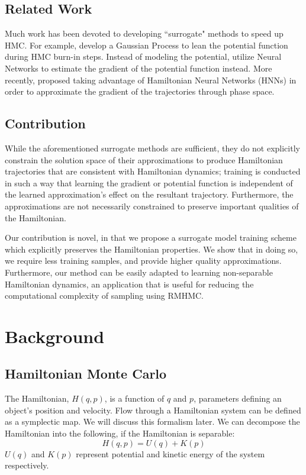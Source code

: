\documentclass{article}
\theoremstyle{plain}
\theoremstyle{definition}
\theoremstyle{remark}
\begin{document}
\subsection{Related Work}
Much work has been devoted to developing ``surrogate" methods to speed up HMC. For example, \cite{10.1093/oso/9780198526155.003.0045} develop a Gaussian Process to lean the potential function during HMC burn-in steps. Instead of modeling the potential, \cite{Li_2019} utilize Neural Networks to estimate the gradient of the potential function instead. More recently, \cite{DHULIPALA2023112425} proposed taking advantage of Hamiltonian Neural Networks (HNNs) in order to approximate the gradient of the trajectories through phase space. 

\subsection{Contribution}
While the aforementioned surrogate methods are sufficient, they do not explicitly constrain the solution space of their approximations to produce Hamiltonian trajectories that are consistent with Hamiltonian dynamics; training is conducted in such a way that learning the gradient or potential function is independent of the learned approximation's effect on the resultant trajectory. Furthermore, the approximations are not necessarily constrained to preserve important qualities of the Hamiltonian.  

Our contribution is novel, in that we propose a surrogate model training scheme which explicitly preserves the Hamiltonian properties. We show that in doing so, we require less training samples, and provide higher quality approximations. Furthermore, our method can be easily adapted to learning non-separable Hamiltonian dynamics, an application that is useful for reducing the computational complexity of sampling using RMHMC.  



\section{Background}
\label{background}
\subsection{Hamiltonian Monte Carlo}
The Hamiltonian, $H(q,p)$, is a function of $q$ and $p$, parameters defining an object's position and velocity. Flow through a Hamiltonian system can be defined as a symplectic map. We will discuss this formalism later. 
We can decompose the Hamiltonian into the following, if the Hamiltonian is separable:
$$ H(q,p) = U(q) + K(p) $$
$U(q)$ and $K(p)$ represent potential and kinetic energy of the system respectively. 
\end{document}
